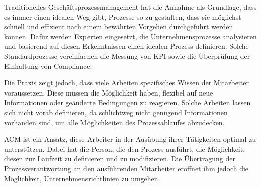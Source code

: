 \vspace{1cm}


Traditionelles Geschäftsprozessmanagement hat die Annahme als Grundlage, dass es immer einen idealen Weg gibt, Prozesse so zu gestalten, dass sie möglichst schnell und effizient nach einem bewährten Vorgehen durchgeführt werden können. Dafür werden Experten eingesetzt, die Unternehmensprozesse analysieren und basierend auf diesen Erkenntnissen einen idealen Prozess definieren. Solche Standardprozesse vereinfachen die Messung von \ac{KPI} sowie die Überprüfung der Einhaltung von Compliance.

Die Praxis zeigt jedoch, dass viele Arbeiten spezifisches Wissen der Mitarbeiter voraussetzen. Diese müssen die Möglichkeit haben, flexibel auf neue Informationen oder geänderte Bedingungen zu reagieren. Solche Arbeiten lassen sich nicht vorab definieren, da schlichtweg nicht genügend Informationen vorhanden sind, um alle Möglichkeiten des Prozessablaufes abzudecken. 

\ac{ACM} ist ein Ansatz, diese Arbeiter in der Ausübung ihrer Tätigkeiten optimal zu unterstützen. Dabei hat die Person, die den Prozess ausführt, die Möglichkeit, diesen zur Laufzeit zu definieren und zu modifizieren. Die Übertragung der Prozessverantwortung an den ausführenden Mitarbeiter eröffnet ihm jedoch die Möglichkeit, Unternehmensrichtlinien zu umgehen. 

